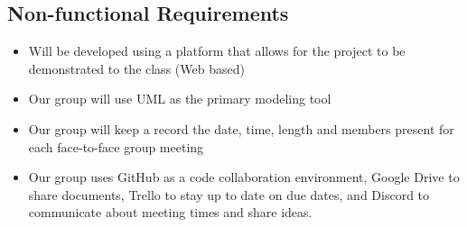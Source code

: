 \documentclass[letterpaper]{article}
\begin{document}
\pagebreak

\subsection{Non-functional Requirements}
\begin{itemize}
  \item  Will be developed using a platform that allows for the project to be demonstrated to the class (Web based)
  \item Our group will use UML as the primary modeling tool
  \item Our group will keep a record the date, time, length and members present for each face-to-face group meeting
  \item Our group uses GitHub as a code collaboration environment, Google Drive to share documents, Trello to stay up to date on due dates, and Discord to communicate about meeting times and share ideas. 
\end{itemize}

\pagebreak

\end{document}
